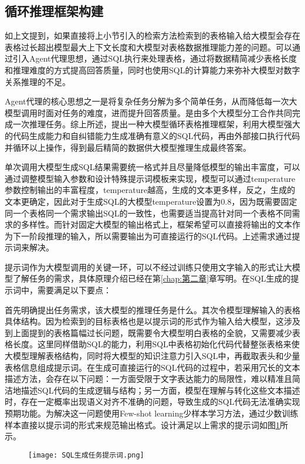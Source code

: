 \subsection{循环推理框架构建}
如上文提到，如果直接将上小节引入的检索方法检索到的表格输入给大模型会存在表格过长超出模型最大上下文长度和大模型对表格数据推理能力差的问题。可以通过引入Agent代理思想，通过SQL执行来处理表格，通过将数据精简减少表格长度和推理难度的方式提高回答质量，同时也使用SQL的计算能力来弥补大模型对数字关系推理的不足。

Agent代理的核心思想之一是将复杂任务分解为多个简单任务，从而降低每一次大模型调用时面对任务的难度，进而提升回答质量。是由多个大模型分工合作共同完成一次推理任务。综上所述，提出一种大模型循环表格推理框架，利用大模型强大的代码生成能力和自纠错能力生成准确有意义的SQL代码，再由外部接口执行代码并循环以上操作，得到最后精简的数据供大模型推理生成最终答案。

单次调用大模型生成SQL结果需要统一格式并且尽量降低模型的输出丰富度，可以通过调整模型输入参数和设计特殊提示词模板来实现，模型可以通过temperature参数控制输出的丰富程度，temperature越高，生成的文本更多样，反之，生成的文本更确定，因此对于生成SQL的大模型temperature设置为0.8，因为既需要固定同一个表格同一个需求输出SQL的一致性，也需要适当提高针对同一个表格不同需求的多样性。而针对固定大模型的输出格式上，框架希望可以直接将输出的文本作为下一阶段推理的输入，所以需要输出为可直接运行的SQL代码。上述需求通过提示词来解决。

提示词作为大模型调用的关键一环，可以不经过训练只使用文字输入的形式让大模型了解任务的需求，具体原理介绍已经在第\ref{chap:第二章}章写明。在SQL生成的提示词中，需要满足以下要点：

首先明确提出任务需求，该大模型的推理任务是什么。其次令模型理解输入的表格具体结构。因为检索到的目标表格也是以提示词的形式作为输入给大模型，这涉及到上面提到的表格篇幅过长问题，既需要令大模型明白表格的全貌，又需要减少表格长度。这里同样借助SQL的能力，利用SQL中表格初始化代码代替整张表格来使大模型理解表格结构，同时将大模型的知识注意力引入SQL中，再截取表头和少量表格信息组成提示词。在生成可直接运行的SQL代码的过程中，若采用冗长的文本描述方法，会存在以下问题：一方面受限于文字表达能力的局限性，难以精准且简洁地描述SQL代码的生成逻辑与结构；另一方面，模型在理解与转化这些文本描述时，存在一定概率出现语义对齐不准确的问题，导致生成的SQL代码无法准确实现预期功能。为解决这一问题使用Few-shot learning少样本学习方法，通过少数训练样本直接以提示词的形式来规范输出格式。设计满足以上需求的提示词如图\ref{fig:4-3}所示。
\begin{figure}[!htbp]
    \centering
    \texttt{[image: SQL生成任务提示词.png]}
    \label{fig:4-3}
\end{figure}

